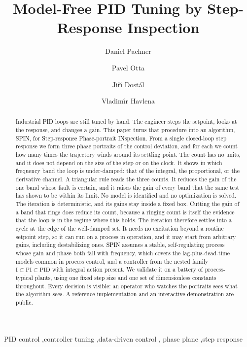 \documentclass[final,3p,times,twocolumn]{elsarticle}
\newcommand{\spin}{SPIN\xspace}
\newcommand{\fix}[1]{#1}  %
\newcommand{\new}[1]{\textcolor{black}{#1}}  %
\begin{document}
\begin{frontmatter}

\title{Model-Free PID Tuning by Step-Response Inspection}

\author[inst1]{Daniel Pachner}
\author[inst1]{Pavel Otta}
\author[inst1]{Ji\v{r}\'{\i} Dost\'al}
\author[inst2]{Vladim\'{\i}r Havlena}



\begin{abstract}
Industrial PID loops are still tuned by hand. The engineer steps the
setpoint, looks at the response, and changes a gain. This paper turns
that procedure into an algorithm, \new{\spin, for Step-response
Phase-portrait INspection}. From a single closed-loop step response we
form three phase portraits of the control deviation, and for each we
count how many times the trajectory winds around its settling point.
The count has no units, and it does not depend on the size of the step
or on the clock. It shows in which frequency band the loop is
under-damped: that of the integral, the proportional, or the derivative
channel. A triangular rule reads the three counts. It reduces the gain
of the one band whose fault is certain, and it raises the gain of every
band that the same test has shown to be within its limit. No model is
identified and no optimization is solved. The iteration is
deterministic, and its gains stay inside a fixed box. Cutting the gain of
a band that rings does reduce its count, because a ringing count is
itself the evidence that the loop is in the regime where this holds. The
iteration therefore settles into a cycle at the edge of the well-damped
set. It needs no excitation beyond a
routine setpoint step, so it can run on a process in operation, and it
may start from arbitrary gains, including destabilizing ones.
\new{\spin} assumes a stable, self-regulating process whose gain and
phase both fall with frequency, \fix{which covers the lag-plus-dead-time
models common in process control,} and a controller from the nested
family
$\mathrm{I} \subset \mathrm{PI} \subset \mathrm{PID}$ with integral
action present. We validate it on a battery of process-typical plants,
using one fixed step size and one set of dimensionless constants
throughout. Every decision is visible: an operator who watches the
portraits sees what the algorithm sees. \new{A reference implementation
and an interactive demonstration are public.}
\end{abstract}

\begin{keyword}
PID control \sep controller tuning \sep data-driven control \sep
phase plane \sep step response
\end{keyword}

\end{frontmatter}
\end{document}
